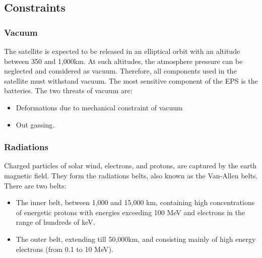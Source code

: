 \subsection{Constraints} 

\subsubsection{Vacuum}

The satellite is expected to be released in an elliptical orbit with an altitude between 350 and 1,000km. At such altitudes, the atmosphere pressure can be neglected and considered as vacuum. Therefore, all components used in the satellite must withstand vacuum. The most sensitive component of the EPS is the batteries. The two threats of vacuum are:
\begin{itemize}
\item Deformations due to mechanical constraint of vacuum
\item Out gassing.
\end{itemize}

\subsubsection{Radiations}

Charged particles of solar wind, electrons, and protons, are captured by the earth magnetic field. They form the radiations belts, also known as the Van-Allen belts. There are two belts:
\begin{itemize}
\item The inner belt, between 1,000 and 15,000 km, containing high concentrations of energetic protons with energies exceeding 100 MeV and electrons in the range of hundreds of keV.
\item The outer belt, extending till 50,000km, and consisting mainly of high energy electrons (from 0.1 to 10 MeV).
\end{itemize}

